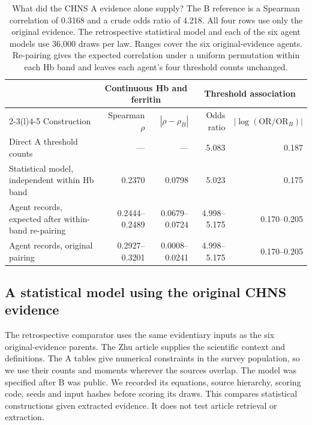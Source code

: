 \begin{table}[t]
\caption{What did the CHNS A evidence alone supply? The B reference is a Spearman correlation of 0.3168 and a crude odds ratio of 4.218. All four rows use only the original evidence. The retrospective statistical model and each of the six agent models use 36,000 draws per law. Ranges cover the six original-evidence agents. Re-pairing gives the expected correlation under a uniform permutation within each Hb band and leaves each agent's four threshold counts unchanged.}
\label{tab:chnsattribution}
\centering
\begin{tabular}{@{}lrrrr@{}}
\toprule
 & \multicolumn{2}{c}{Continuous Hb and ferritin} & \multicolumn{2}{c}{Threshold association}\\
\cmidrule(lr){2-3}\cmidrule(l){4-5}
Construction & Spearman $\rho$ & $|\rho-\rho_B|$ & Odds ratio & $|\log(\mathrm{OR}/\mathrm{OR}_B)|$\\
\midrule
Direct A threshold counts & --- & --- & 5.083 & 0.187\\
Statistical model, independent within Hb band & 0.2370 & 0.0798 & 5.023 & 0.175\\
Agent records, expected after within-band re-pairing & 0.2444--0.2489 & 0.0679--0.0724 & 4.998--5.175 & 0.170--0.205\\
Agent records, original pairing & 0.2927--0.3201 & 0.0008--0.0241 & 4.998--5.175 & 0.170--0.205\\
\bottomrule
\end{tabular}
\end{table}

\subsection{A statistical model using the original CHNS evidence}
\label{app:chnsstat}
The retrospective comparator uses the same evidentiary inputs as the six original-evidence parents. The Zhu article supplies the scientific context and definitions. The A tables give numerical constraints in the survey population, so we use their counts and moments wherever the sources overlap. The model was specified after B was public. We recorded its equations, source hierarchy, scoring code, seeds and input hashes before scoring its draws. This compares statistical constructions given extracted evidence. It does not test article retrieval or extraction.

